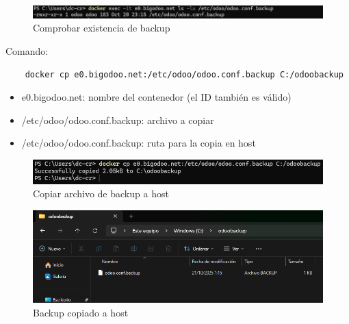 \documentclass[a4paper,12pt]{article}
\begin{document}
\begin{figure}[h!]
    \centering
    \includegraphics[width=1\textwidth]{pr2odoo84-comprobarBackup.png}
    \caption{Comprobar existencia de backup}
\end{figure}
\FloatBarrier

\clearpage

Comando: 
\begin{verbatim}
    docker cp e0.bigodoo.net:/etc/odoo/odoo.conf.backup C:/odoobackup
\end{verbatim}

\begin{itemize}
    \item e0.bigodoo.net: nombre del contenedor (el ID también es válido)
    \item /etc/odoo/odoo.conf.backup: archivo a copiar
    \item /etc/odoo/odoo.conf.backup: ruta para la copia en host
\end{itemize}

\begin{figure}[h!]
    \centering
    \includegraphics[width=1\textwidth]{pr2odoo85-copiarBackupAhost.png}
    \caption{Copiar archivo de backup a host}
\end{figure}
\FloatBarrier

\begin{figure}[h!]
    \centering
    \includegraphics[width=1\textwidth]{pr2odoo86-backupCopiado.png}
    \caption{Backup copiado a host}
\end{figure}
\FloatBarrier
\end{document}
